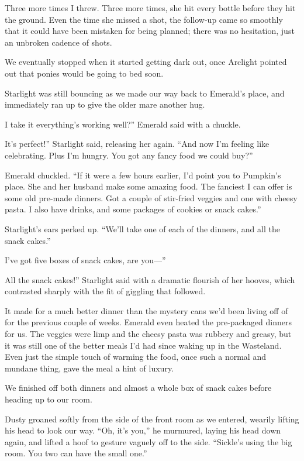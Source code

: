 Three more times I threw. Three more times, she hit every bottle before they hit the ground. Even the time she missed a shot, the follow-up came so smoothly that it could have been mistaken for being planned; there was no hesitation, just an unbroken cadence of shots.

We eventually stopped when it started getting dark out, once Arclight pointed out that ponies would be going to bed soon.

Starlight was still bouncing as we made our way back to Emerald’s place, and immediately ran up to give the older mare another hug.

\leavevmode{}I take it everything’s working well?” Emerald said with a chuckle.

\leavevmode{}It’s perfect!” Starlight said, releasing her again. “And now I’m feeling like celebrating. Plus I’m hungry. You got any fancy food we could buy?”

Emerald chuckled. “If it were a few hours earlier, I’d point you to Pumpkin’s place. She and her husband make some amazing food. The fanciest I can offer is some old pre-made dinners. Got a couple of stir-fried veggies and one with cheesy pasta. I also have drinks, and some packages of cookies or snack cakes.”

Starlight’s ears perked up. “We’ll take one of each of the dinners, and all the snack cakes.”

\leavevmode{}I’ve got five boxes of snack cakes, are you—”

\leavevmode{}All the snack cakes!” Starlight said with a dramatic flourish of her hooves, which contrasted sharply with the fit of giggling that followed.

It made for a much better dinner than the mystery cans we’d been living off of for the previous couple of weeks. Emerald even heated the pre-packaged dinners for us. The veggies were limp and the cheesy pasta was rubbery and greasy, but it was still one of the better meals I’d had since waking up in the Wasteland. Even just the simple touch of warming the food, once such a normal and mundane thing, gave the meal a hint of luxury.

We finished off both dinners and almost a whole box of snack cakes before heading up to our room.

Dusty groaned softly from the side of the front room as we entered, wearily lifting his head to look our way. “Oh, it’s you,” he murmured, laying his head down again, and lifted a hoof to gesture vaguely off to the side. “Sickle’s using the big room. You two can have the small one.”

